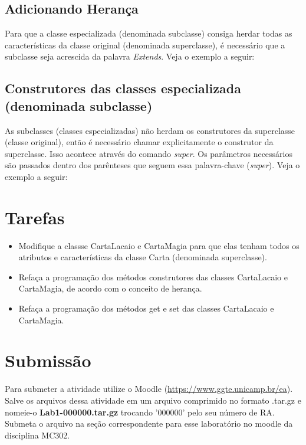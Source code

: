 \documentclass[10pt]{article}
\begin{document}
\subsection{Adicionando Herança}
Para que a classe especializada (denominada subclasse) consiga herdar todas as características da classe original (denominada superclasse), é necessário que a subclasse seja acrescida da palavra {\itshape Extends}. Veja o exemplo a seguir:



\subsection{Construtores das classes especializada (denominada subclasse)}
As subclasses (classes especializadas) não herdam os construtores da superclasse (classe original), então é necessário chamar explicitamente o construtor da superclasse. Isso acontece através do comando {\itshape super}. Os parâmetros necessários são passados dentro dos parênteses que seguem essa palavra-chave ({\itshape super}). Veja o exemplo a seguir:



\section{Tarefas}

\begin{itemize}
	\item Modifique a classse CartaLacaio e CartaMagia para que elas tenham todos os atributos e características da classe Carta (denominada superclasse).
	\item Refaça a programação dos métodos construtores das classes CartaLacaio e CartaMagia, de acordo com o conceito de herança.
	\item Refaça a programação dos métodos get e set das classes CartaLacaio e CartaMagia.
\end{itemize}

\section{Submissão}

Para submeter a atividade utilize o Moodle (\url{https://www.ggte.unicamp.br/ea}). Salve os arquivos dessa atividade em um arquivo comprimido no formato .tar.gz e nomeie-o \textbf{Lab1-000000.tar.gz} trocando '000000' pelo seu número de RA. Submeta o arquivo na seção correspondente para esse laboratório no moodle da disciplina MC302.
\end{document}
